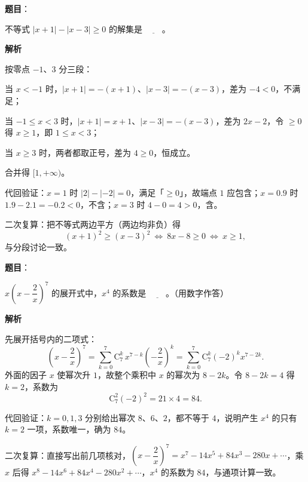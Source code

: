 \begin{answer}

\textbf{题目}：

不等式 $|x+1|-|x-3|\geqslant0$ 的解集是 $\underline{\qquad}$。

\textbf{解析}

按零点 $-1$、$3$ 分三段：

当 $x<-1$ 时，$|x+1|=-(x+1)$、$|x-3|=-(x-3)$，差为 $-4<0$，不满足；

当 $-1\leqslant x<3$ 时，$|x+1|=x+1$、$|x-3|=-(x-3)$，差为 $2x-2$，令 $\geqslant0$ 得 $x\geqslant1$，即 $1\leqslant x<3$；

当 $x\geqslant3$ 时，两者都取正号，差为 $4\geqslant0$，恒成立。

合并得 $[1,+\infty)$。

代回验证：$x=1$ 时 $|2|-|-2|=0$，满足「$\geqslant0$」，故端点 $1$ 应包含；$x=0.9$ 时 $1.9-2.1=-0.2<0$，不含；$x=3$ 时 $4-0=4>0$，含。

二次复算：把不等式两边平方（两边均非负）得
\nopagebreak[4]
\[(x+1)^2\geqslant(x-3)^2\ \Longleftrightarrow\ 8x-8\geqslant0\ \Longleftrightarrow\ x\geqslant1,\]
与分段讨论一致。

\gkanswer{答案：$[1,+\infty)$。}

\end{answer}
\begin{answer}

\textbf{题目}：

$x\left(x-\dfrac2x\right)^7$ 的展开式中，$x^4$ 的系数是 $\underline{\qquad}$。（用数字作答）

\textbf{解析}

先展开括号内的二项式：
\nopagebreak[4]
\[\left(x-\frac2x\right)^7=\sum_{k=0}^{7}\mathrm C_7^k\,x^{7-k}\left(-\frac2x\right)^k=\sum_{k=0}^{7}\mathrm C_7^k(-2)^k x^{7-2k}.\]
外面的因子 $x$ 使幂次升 $1$，故整个乘积中 $x$ 的幂次为 $8-2k$。令 $8-2k=4$ 得 $k=2$，系数为
\nopagebreak[4]
\[\mathrm C_7^2(-2)^2=21\times4=84.\]

代回验证：$k=0,1,3$ 分别给出幂次 $8$、$6$、$2$，都不等于 $4$，说明产生 $x^4$ 的只有 $k=2$ 一项，系数唯一，确为 $84$。

二次复算：直接写出前几项核对，$\left(x-\dfrac2x\right)^7=x^7-14x^5+84x^3-280x+\cdots$，乘 $x$ 后得 $x^8-14x^6+84x^4-280x^2+\cdots$，$x^4$ 的系数为 $84$，与通项计算一致。


\end{answer}
